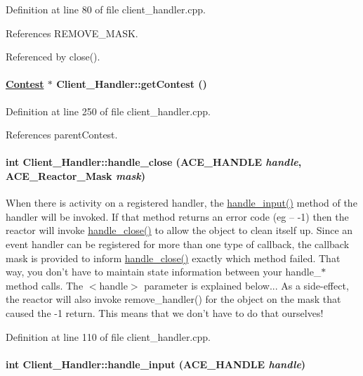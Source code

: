 Definition at line 80 of file client\_\-handler.cpp.

References REMOVE\_\-MASK.

Referenced by close().\hypertarget{classClient__Handler_Client__Handlera7}{
\paragraph[getContest]{\setlength{\rightskip}{0pt plus 5cm}\hyperlink{classContest}{Contest} $\ast$ Client\_\-Handler::get\-Contest ()}\hfill}
\label{classClient__Handler_Client__Handlera7}




Definition at line 250 of file client\_\-handler.cpp.

References parent\-Contest.\hypertarget{classClient__Handler_Client__Handlera4}{
\paragraph[handle\_\-close]{\setlength{\rightskip}{0pt plus 5cm}int Client\_\-Handler::handle\_\-close (ACE\_\-HANDLE {\em handle}, ACE\_\-Reactor\_\-Mask {\em mask})}\hfill}
\label{classClient__Handler_Client__Handlera4}


When there is activity on a registered handler, the \hyperlink{classClient__Handler_Client__Handlera5}{handle\_\-input()} method of the handler will be invoked. If that method returns an error code (eg -- -1) then the reactor will invoke \hyperlink{classClient__Handler_Client__Handlera4}{handle\_\-close()} to allow the object to clean itself up. Since an event handler can be registered for more than one type of callback, the callback mask is provided to inform \hyperlink{classClient__Handler_Client__Handlera4}{handle\_\-close()} exactly which method failed. That way, you don't have to maintain state information between your handle\_\-$\ast$ method calls. The $<$handle$>$ parameter is explained below... As a side-effect, the reactor will also invoke remove\_\-handler() for the object on the mask that caused the -1 return. This means that we don't have to do that ourselves! 

Definition at line 110 of file client\_\-handler.cpp.\hypertarget{classClient__Handler_Client__Handlera5}{
\paragraph[handle\_\-input]{\setlength{\rightskip}{0pt plus 5cm}int Client\_\-Handler::handle\_\-input (ACE\_\-HANDLE {\em handle})}\hfill}
\label{classClient__Handler_Client__Handlera5}


